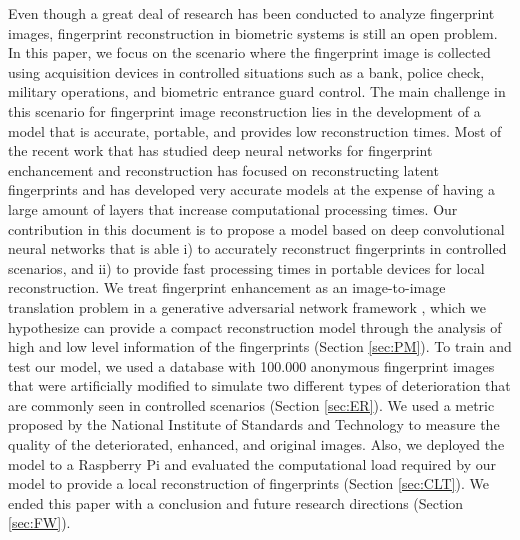 \documentclass[a4paper,fleqn]{cas-dc}
\begin{document}
Even though a great deal of research has been conducted to analyze fingerprint images, fingerprint reconstruction in biometric systems is still an open problem. In this paper, we focus on the scenario where the fingerprint image is collected using acquisition devices in controlled situations such as a bank, police check, military operations, and biometric entrance guard control. The main challenge in this scenario for fingerprint image reconstruction lies in the development of a model that is accurate, portable, and provides low reconstruction times. Most of the recent work that has studied deep neural networks for fingerprint enchancement and reconstruction has focused on reconstructing latent fingerprints and has developed very accurate models at the expense of having a large amount of layers that increase computational processing times. Our contribution in this document is to propose a model based on deep convolutional neural networks that is able i) to accurately reconstruct fingerprints in controlled scenarios, and ii) to provide fast processing times in portable devices for local reconstruction. We treat fingerprint enhancement as an image-to-image translation problem in a generative adversarial network framework \cite{ITITAN,goodfellow2016deep}, which we hypothesize can provide a compact reconstruction model through the analysis of high and low level information of the fingerprints (Section \ref{sec:PM}). To train and test our model, we used a database with 100.000 anonymous fingerprint images that were artificially modified to simulate two different types of deterioration that are commonly seen in controlled scenarios (Section \ref{sec:ER}). We used a metric proposed by the National Institute of Standards and Technology to measure the quality of the deteriorated, enhanced, and original images. Also, we deployed the model to a Raspberry Pi and evaluated the computational load required by our model to provide a local reconstruction of fingerprints (Section \ref{sec:CLT}). We ended this paper with a conclusion and future research directions (Section \ref{sec:FW}). 


     
\end{document}
